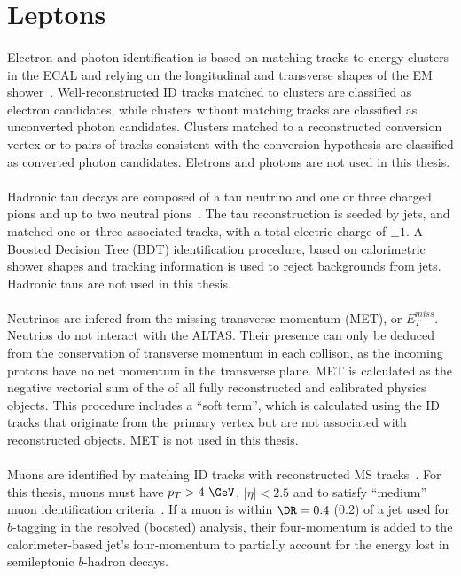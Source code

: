 \section{Leptons}
\paragraph{}
Electron and photon identification is based on matching tracks to energy clusters in the ECAL and relying on the longitudinal and transverse shapes of the EM shower~\cite{ATLAS-CONF-2016-024}. Well-reconstructed ID tracks matched to clusters are classified as electron candidates, while clusters without matching tracks are classified as unconverted photon candidates. Clusters matched to a reconstructed conversion vertex or to pairs of tracks consistent with the conversion hypothesis are classified as converted photon candidates. Eletrons and photons are not used in this thesis.

\paragraph{}
Hadronic tau decays are composed of a tau neutrino and one or three charged pions and up to two neutral pions~\cite{ATLAS-CONF-2017-029}. The tau reconstruction is seeded by jets, and matched one or three associated tracks, with a total electric charge of $\pm 1$. A Boosted Decision Tree (BDT) identification procedure, based on calorimetric shower shapes and tracking information is used to reject backgrounds from jets. Hadronic taus are not used in this thesis.

\paragraph{}
Neutrinos are infered from the missing transverse momentum (MET), or $E_T^{miss}$. Neutrios do not interact with the ALTAS. Their presence can only be deduced from the conservation of transverse momentum in each collison, as the incoming protons have no net momentum in the transverse plane. MET is calculated as the negative vectorial sum of the \pt of all fully reconstructed and calibrated physics objects. This procedure includes a “soft term”, which is calculated using the ID tracks that originate from the primary vertex but are not associated with reconstructed objects. MET is not used in this thesis.

\paragraph{}
Muons are identified by matching ID tracks with reconstructed MS tracks~\cite{Aad:2016jkr}. For this thesis, muons must have $p_T > 4~\GeV$, $|\eta| < 2.5$ and to satisfy ``medium'' muon identification criteria~\cite{Aad:2016jkr}. If a muon is within $\DR = 0.4$ (0.2) of a jet used for $b$-tagging in the resolved (boosted) analysis, their four-momentum is added to the calorimeter-based jet's four-momentum to partially account for the energy lost in semileptonic $b$-hadron decays.




